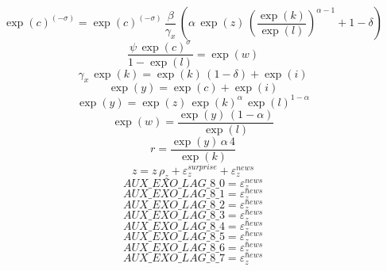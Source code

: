 \begin{dmath}
\exp\left({c}\right)^{\left(-{\sigma}\right)}=\exp\left({c}\right)^{\left(-{\sigma}\right)}\, \frac{{\beta}}{{\gamma_x}}\, \left({\alpha}\, \exp\left({z}\right)\, \left(\frac{\exp\left({k}\right)}{\exp\left({l}\right)}\right)^{{\alpha}-1}+1-{\delta}\right)
\end{dmath}
\begin{dmath}
\frac{{\psi}\, \exp\left({c}\right)^{{\sigma}}}{1-\exp\left({l}\right)}=\exp\left({w}\right)
\end{dmath}
\begin{dmath}
{\gamma_x}\, \exp\left({k}\right)=\exp\left({k}\right)\, \left(1-{\delta}\right)+\exp\left({{i}}\right)
\end{dmath}
\begin{dmath}
\exp\left({y}\right)=\exp\left({c}\right)+\exp\left({{i}}\right)
\end{dmath}
\begin{dmath}
\exp\left({y}\right)=\exp\left({z}\right)\, \exp\left({k}\right)^{{\alpha}}\, \exp\left({l}\right)^{1-{\alpha}}
\end{dmath}
\begin{dmath}
\exp\left({w}\right)=\frac{\exp\left({y}\right)\, \left(1-{\alpha}\right)}{\exp\left({l}\right)}
\end{dmath}
\begin{dmath}
{r}=\frac{\exp\left({y}\right)\, {\alpha}\, 4}{\exp\left({k}\right)}
\end{dmath}
\begin{dmath}
{z}={z}\, {\rho_z}+{{\varepsilon_z^{surprise}}}+{{\varepsilon_z^{news}}}
\end{dmath}
\begin{dmath}
{AUX\_EXO\_LAG\_8\_0}={{\varepsilon_z^{news}}}
\end{dmath}
\begin{dmath}
{AUX\_EXO\_LAG\_8\_1}={{\varepsilon_z^{news}}}
\end{dmath}
\begin{dmath}
{AUX\_EXO\_LAG\_8\_2}={{\varepsilon_z^{news}}}
\end{dmath}
\begin{dmath}
{AUX\_EXO\_LAG\_8\_3}={{\varepsilon_z^{news}}}
\end{dmath}
\begin{dmath}
{AUX\_EXO\_LAG\_8\_4}={{\varepsilon_z^{news}}}
\end{dmath}
\begin{dmath}
{AUX\_EXO\_LAG\_8\_5}={{\varepsilon_z^{news}}}
\end{dmath}
\begin{dmath}
{AUX\_EXO\_LAG\_8\_6}={{\varepsilon_z^{news}}}
\end{dmath}
\begin{dmath}
{AUX\_EXO\_LAG\_8\_7}={{\varepsilon_z^{news}}}
\end{dmath}
